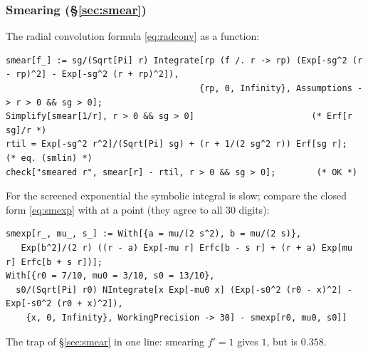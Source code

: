 \documentclass[11pt,a4paper]{article}
\numberwithin{equation}{section}
\theoremstyle{definition}
\theoremstyle{plain}
\theoremstyle{remark}
\numberwithin{algorithm}{section}
\begin{document}
\subsubsection{Smearing (\S\ref{sec:smear})}
The radial convolution formula \eqref{eq:radconv} as a function:
\begin{lstlisting}[style=wl]
smear[f_] := sg/(Sqrt[Pi] r) Integrate[rp (f /. r -> rp) (Exp[-sg^2 (r - rp)^2] - Exp[-sg^2 (r + rp)^2]),
                                      {rp, 0, Infinity}, Assumptions -> r > 0 && sg > 0];
Simplify[smear[1/r], r > 0 && sg > 0]                       (* Erf[r sg]/r *)
rtil = Exp[-sg^2 r^2]/(Sqrt[Pi] sg) + (r + 1/(2 sg^2 r)) Erf[sg r];    (* eq. (smlin) *)
check["smeared r", smear[r] - rtil, r > 0 && sg > 0];        (* OK *)
\end{lstlisting}
For the screened exponential the symbolic integral is slow; compare the closed form \eqref{eq:smexp} with  at a point (they agree to all 30 digits):
\begin{lstlisting}[style=wl]
smexp[r_, mu_, s_] := With[{a = mu/(2 s^2), b = mu/(2 s)},
   Exp[b^2]/(2 r) ((r - a) Exp[-mu r] Erfc[b - s r] + (r + a) Exp[mu r] Erfc[b + s r])];
With[{r0 = 7/10, mu0 = 3/10, s0 = 13/10},
  s0/(Sqrt[Pi] r0) NIntegrate[x Exp[-mu0 x] (Exp[-s0^2 (r0 - x)^2] - Exp[-s0^2 (r0 + x)^2]),
    {x, 0, Infinity}, WorkingPrecision -> 30] - smexp[r0, mu0, s0]]
\end{lstlisting}
The trap of \S\ref{sec:smear} in one line: smearing $f'=1$ gives $1$, but  is $0.358$.
\end{document}
